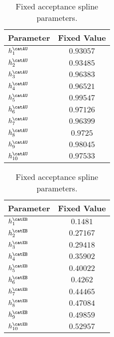 \begin{table}[h]
\caption{Fixed \catAU acceptance spline parameters.}
\label{tab:app:measurement_of_sin2beta:cpv_measurement:fixed_parameters:acc:au}
\centering
\begin{tabular}{lr@{$\,\pm\,$}l}
  \toprule
  Parameter              & \multicolumn{2}{c}{Fixed Value} \\
  \midrule
    $h_1^\text{\catAU}$  & \multicolumn{2}{c}{$0.93057$}\\
    $h_2^\text{\catAU}$  & \multicolumn{2}{c}{$0.93485$}\\
    $h_3^\text{\catAU}$  & \multicolumn{2}{c}{$0.96383$}\\
    $h_4^\text{\catAU}$  & \multicolumn{2}{c}{$0.96521$}\\
    $h_5^\text{\catAU}$  & \multicolumn{2}{c}{$0.99547$}\\
    $h_6^\text{\catAU}$  & \multicolumn{2}{c}{$0.97126$}\\
    $h_7^\text{\catAU}$  & \multicolumn{2}{c}{$0.96399$}\\
    $h_8^\text{\catAU}$  & \multicolumn{2}{c}{$0.9725$}\\
    $h_9^\text{\catAU}$  & \multicolumn{2}{c}{$0.98045$}\\
    $h_{10}^\text{\catAU}$ & \multicolumn{2}{c}{$0.97533$}\\
    \bottomrule
\end{tabular}
\end{table}
%
\begin{table}[h]
\caption{Fixed \catEB acceptance spline parameters.}
\label{tab:app:measurement_of_sin2beta:cpv_measurement:fixed_parameters:acc:eb}
\centering
\begin{tabular}{lr@{$\,\pm\,$}l}
  \toprule
  Parameter               & \multicolumn{2}{c}{Fixed Value} \\
  \midrule  
    $h_1^\text{\catEB}$   & \multicolumn{2}{c}{$0.1481$}\\
    $h_2^\text{\catEB}$   & \multicolumn{2}{c}{$0.27167$}\\
    $h_3^\text{\catEB}$   & \multicolumn{2}{c}{$0.29418$}\\
    $h_4^\text{\catEB}$   & \multicolumn{2}{c}{$0.35902$}\\
    $h_5^\text{\catEB}$   & \multicolumn{2}{c}{$0.40022$}\\
    $h_6^\text{\catEB}$   & \multicolumn{2}{c}{$0.4262$}\\
    $h_7^\text{\catEB}$   & \multicolumn{2}{c}{$0.44465$}\\
    $h_8^\text{\catEB}$   & \multicolumn{2}{c}{$0.47084$}\\
    $h_9^\text{\catEB}$   & \multicolumn{2}{c}{$0.49859$}\\
    $h_{10}^\text{\catEB}$ & \multicolumn{2}{c}{$0.52957$}\\
    \bottomrule
\end{tabular}
\end{table}

